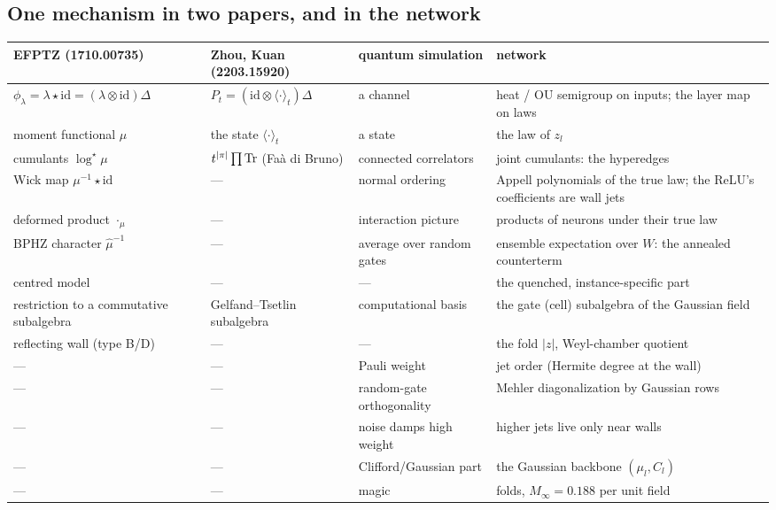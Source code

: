 \subsection{One mechanism in two papers, and in the network}
\begin{center}\small
\begin{tabular}{>{\raggedright\arraybackslash}p{3.6cm}>{\raggedright\arraybackslash}p{3.3cm}>{\raggedright\arraybackslash}p{3.0cm}>{\raggedright\arraybackslash}p{4.6cm}}\toprule
EFPTZ (1710.00735) & Zhou, Kuan (2203.15920) & quantum simulation & network\\\midrule
$\phi_\lambda=\lambda\star\mathrm{id}=(\lambda\otimes\mathrm{id})\Delta$ & $P_t=(\mathrm{id}\otimes\langle\cdot\rangle_t)\Delta$ & a channel & heat / OU semigroup on inputs; the layer map on laws\\
moment functional $\mu$ & the state $\langle\cdot\rangle_t$ & a state & the law of $z_l$\\
cumulants $\log^\star\mu$ & $t^{|\pi|}\prod\operatorname{Tr}$ (Faà di Bruno) & connected correlators & joint cumulants: the hyperedges\\
Wick map $\mu^{-1}\star\mathrm{id}$ & --- & normal ordering & Appell polynomials of the true law; the ReLU's coefficients are wall jets\\
deformed product $\cdot_\mu$ & --- & interaction picture & products of neurons under their true law\\
BPHZ character $\hat\mu^{-1}$ & --- & average over random gates & ensemble expectation over $W$: the annealed counterterm\\
centred model & --- & --- & the quenched, instance-specific part\\
restriction to a commutative subalgebra & Gelfand--Tsetlin subalgebra & computational basis & the gate (cell) subalgebra of the Gaussian field\\
reflecting wall (type B/D) & --- & --- & the fold $|z|$, Weyl-chamber quotient\\
--- & --- & Pauli weight & jet order (Hermite degree at the wall)\\
--- & --- & random-gate orthogonality & Mehler diagonalization by Gaussian rows\\
--- & --- & noise damps high weight & higher jets live only near walls\\
--- & --- & Clifford/Gaussian part & the Gaussian backbone $(\mu_l,C_l)$\\
--- & --- & magic & folds, $M_\infty=0.188$ per unit field\\\bottomrule
\end{tabular}
\end{center}

